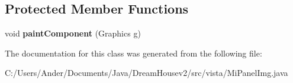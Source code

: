 \subsection*{Protected Member Functions}
\begin{DoxyCompactItemize}
\item 
\mbox{\label{classvista_1_1_mi_panel_img_af77d7ca2dae07436d36a06c31f00d6e1}} 
void {\bfseries paint\+Component} (Graphics g)
\end{DoxyCompactItemize}


The documentation for this class was generated from the following file\+:\begin{DoxyCompactItemize}
\item 
C\+:/\+Users/\+Ander/\+Documents/\+Java/\+Dream\+Housev2/src/vista/Mi\+Panel\+Img.\+java\end{DoxyCompactItemize}
